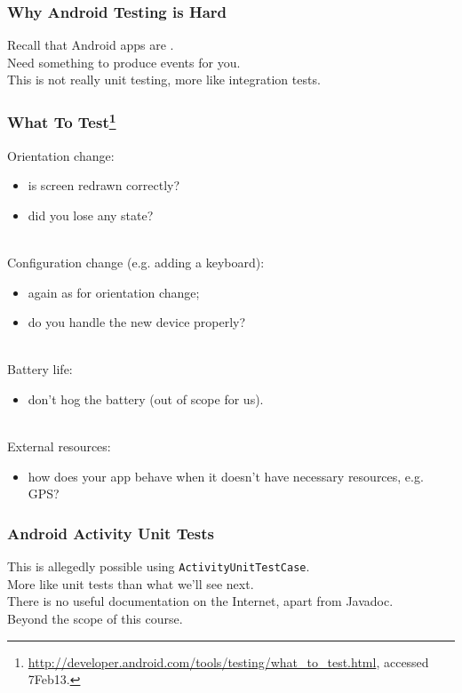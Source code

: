 \begin{frame}
\frametitle{Why Android Testing is Hard}

\begin{changemargin}{1cm}
Recall that Android apps are .\\[1em]

Need something to produce events for you.\\[1em]

This is not really unit testing, more like integration tests.
\end{changemargin}
\end{frame}


\begin{frame}
\frametitle{What To Test\footnote{\tiny \url{http://developer.android.com/tools/testing/what_to_test.html}, accessed 7Feb13.}}

\begin{changemargin}{1cm}

Orientation change:
\begin{itemize}
\item is screen redrawn correctly?
\item did you lose any state?
\end{itemize}
~\\[0.5em]

Configuration change (e.g. adding a keyboard):
\begin{itemize}
\item again as for orientation change;
\item do you handle the new device properly?
\end{itemize}~\\[0.5em]

Battery life:
\begin{itemize}
\item don't hog the battery (out of scope for us).
\end{itemize}~\\[0.5em]

External resources:
\begin{itemize}
\item how does your app behave when it doesn't have
necessary resources, e.g. GPS?
\end{itemize}

\end{changemargin}

\end{frame}

\begin{frame}
\frametitle{Android Activity Unit Tests}

\begin{changemargin}{1cm}
\large
This is allegedly possible using {\tt ActivityUnitTestCase}.\\[1em]
More like unit tests than what we'll see next.\\[1em]
There is no useful documentation on the Internet, apart from Javadoc.\\[1em]
Beyond the scope of this course.
\end{changemargin}
\end{frame}



